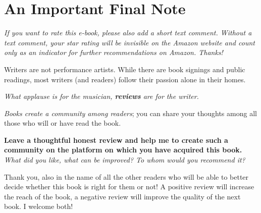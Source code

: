 


\chapter{An Important Final Note}

\ifxetex \else \textit{If you want to rate this e-book, please also add a short text comment. Without a text comment, your star rating will be invisible on the Amazon website and count only as an indicator for further recommendations on Amazon. Thanks!}\fi

Writers are not performance artists. While there are book signings and public readings, most writers (and readers) follow their passion alone in their homes.

\textit{What applause is for the musician, \textbf{reviews} are for the writer.} 

\textit{Books create a community among readers}; you can share your thoughts among all those who will or have read the book.

\textbf{Leave a thoughtful honest review and help me to create such a community on the platform on which you have acquired this book.} \textit{What did you like, what can be improved? To whom would you recommend it?} 

Thank you, also in the name of all the other readers who will be able to better decide whether this book is right for them or not! A positive review will increase the reach of the book, a negative review will improve the quality of the next book. I welcome both!